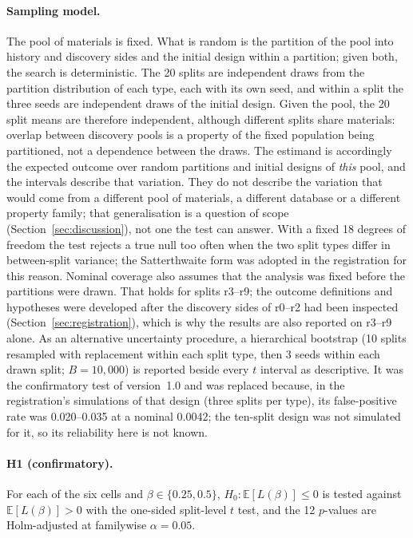 \paragraph{Sampling model.} The pool of materials is fixed. What is random is the partition of the pool into history and
discovery sides and the initial design within a partition; given both, the search is deterministic. The 20 splits are independent draws from the partition distribution
of each type, each with its own seed, and within a split the three seeds are independent draws of the initial design. Given the
pool, the 20 split means are therefore independent, although different splits share materials: overlap between discovery pools
is a property of the fixed population being partitioned, not a dependence between the draws. The estimand is accordingly the
expected outcome over random partitions and initial designs of \emph{this} pool, and the intervals describe that variation. They
do not describe the variation that would come from a different pool of materials, a different database or a different property
family; that generalisation is a question of scope (Section~\ref{sec:discussion}), not one the test can answer. With a fixed 18
degrees of freedom the test rejects a true null too often when the two split types differ in between-split variance; the
Satterthwaite form was adopted in the registration for this reason. Nominal coverage also assumes that the analysis was fixed
before the partitions were drawn. That holds for splits r3--r9; the outcome definitions and hypotheses were developed after the
discovery sides of r0--r2 had been inspected (Section~\ref{sec:registration}), which is why the results are also reported on
r3--r9 alone. As an alternative uncertainty procedure, a hierarchical bootstrap (10 splits resampled with replacement within each split type, then 3
seeds within each drawn split; $B=10{,}000$) is reported beside every $t$ interval as descriptive. It was the confirmatory test of version~1.0 and was replaced because, in
the registration's simulations of that design (three splits per type), its false-positive rate was 0.020--0.035 at a nominal
0.0042; the ten-split design was not simulated for it, so its reliability here is not known.

\paragraph{H1 (confirmatory).} For each of the six cells and $\beta\in\{0.25,0.5\}$, $H_0\colon \mathbb{E}[L(\beta)]\le0$ is tested
against $\mathbb{E}[L(\beta)]>0$ with the one-sided split-level $t$ test, and the 12 $p$-values are Holm-adjusted\cite{holm1979} at
familywise $\alpha=0.05$.

